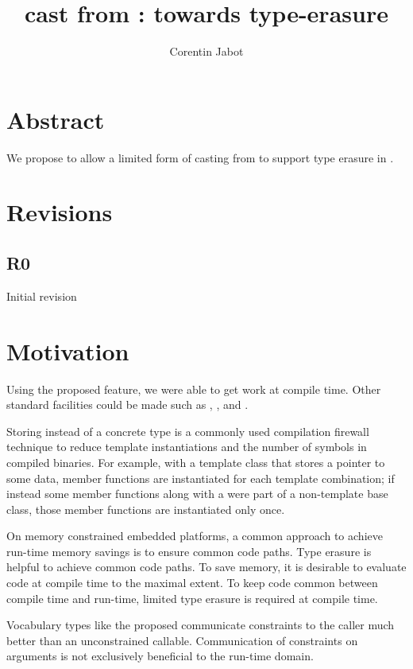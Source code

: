\documentclass{wg21}
\title{\tcode{constexpr} cast from \tcode{void*}: towards \tcode{constexpr} type-erasure}
\author{Corentin Jabot}{corentin.jabot@gmail.com}
\begin{document}
    \maketitle

    \section{Abstract}

    We propose to allow a limited form of casting from  to support type erasure in .

    \section{Revisions}

    \subsection{R0}

    Initial revision

    \section{Motivation}

    Using the proposed feature, we were able to get  work at compile time. Other standard facilities could be made  such as , , and .

    Storing  instead of a concrete type is a commonly used compilation firewall technique to reduce template
    instantiations and the number of symbols in compiled binaries. For example, with a template class that stores a  pointer to some data, member functions are instantiated for each template combination; if instead some member functions along with a  were part of a non-template base class, those member functions are instantiated only once.

    On memory constrained embedded platforms, a common approach to achieve run-time memory savings is to ensure common code paths. Type erasure is helpful to achieve common code paths. To save memory, it is desirable to evaluate code at compile time to the maximal extent. To keep code common between compile time and run-time, limited type erasure is required at compile time.

    Vocabulary types like the proposed  communicate constraints to the caller much better than an unconstrained callable. Communication of constraints on arguments is not exclusively beneficial to the run-time domain.
\end{document}
